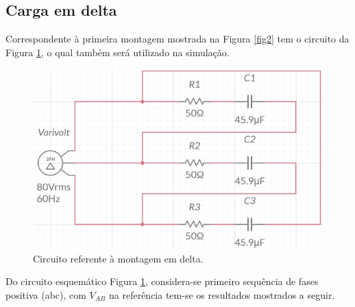\documentclass[a4paper,12pt,oneside,openany,table,xcdraw]{article}
\begin{document}
\subsection{Carga em delta}
Correspondente à primeira montagem mostrada na Figura \ref{fig2} tem o circuito da Figura \ref{delta:circuito}, o qual também será utilizado na simulação.
\begin{figure}[H]
\centering
\includegraphics[width=13.5cm]{m2-esquema}
\caption{Circuito referente à montagem em delta.}
\label{delta:circuito}
\end{figure}
Do circuito esquemático Figura \ref{delta:circuito}, considera-se primeiro sequência de fases positiva (abc), com $V_{AB}$ na referência tem-se os resultados mostrados a seguir.
\end{document}

